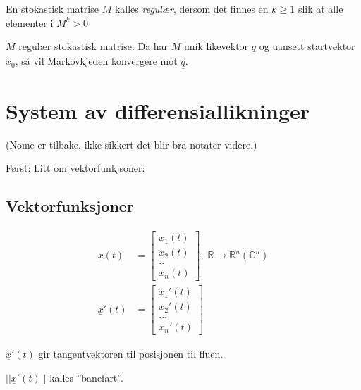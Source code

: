 \documentclass[11pt, a4paper, norsk]{article}
\begin{document}
            \begin{Definition}{}{}
                En stokastisk matrise $M$ kalles \textit{regulær}, dersom det finnes en $k \geq 1$ slik at alle elementer i $M^k > 0$
            \end{Definition}
            \begin{Theorem}{}{}
                $M$ regulær stokastisk matrise. Da har $M$ unik likevektor $\underline{q}$ og uansett startvektor $x_0$, så vil Markovkjeden konvergere mot $\underline{q}$.
            \end{Theorem}

            \section{System av differensiallikninger}
            (Nome er tilbake, ikke sikkert det blir bra notater videre.)

            Først: Litt om vektorfunkjsoner:
            \subsection{Vektorfunksjoner}%
            \label{sub:vektorfunksjoner}
            
            \begin{align*}
                \underline{x}(t) &= \begin{bmatrix}
                    x_1(t) \\
                    x_2(t) \\
                    .. \\
                    x_{n}(t)
                \end{bmatrix}, \; \mathbb{R} \rightarrow \mathbb{R}^{n} (\mathbb{C}^{n})
                \\
                    \underline{x}'(t) &= \begin{bmatrix}
                        x_1'(t) \\
                        x_2'(t) \\
                        ... \\
                        x_{n}'(t)
                    \end{bmatrix}
            \end{align*}

            $\underline{x}'(t)$ gir tangentvektoren til posisjonen til fluen.

            $||\underline{x}'(t)||$ kalles ''banefart''.
            
\end{document}
